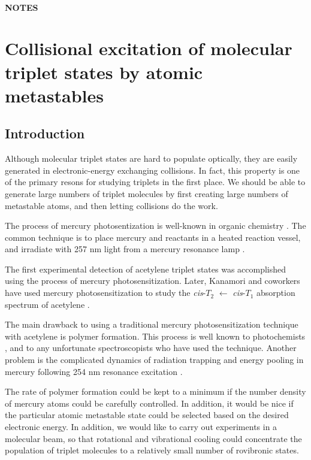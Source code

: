 \documentclass[12pt]{mitthesis}
\begin{document}
\tableofcontents
\clearpage

\subsubsection*{NOTES}
\clearpage

\chapter{Collisional excitation of molecular triplet states by atomic
  metastables}

\section{Introduction}


Although molecular triplet states are hard to populate optically, they
are easily generated in electronic-energy exchanging collisions.  In
fact, this property is one of the primary resons for studying triplets
in the first place.  We should be able to generate large numbers of
triplet molecules by first creating large numbers of metastable atoms,
and then letting collisions do the work.

The process of mercury photosentization is well-known in organic
chemistry \cite{brown89, brown88, crabtree92, cvetanovic64,
  phillips74, strausz70}.  The common technique is to place mercury
and reactants in a heated reaction vessel, and irradiate with 257 nm
light from a mercury resonance lamp \cite{brown87}.

The first experimental detection of acetylene triplet states was
accomplished using the process of mercury photosensitization.  Later,
Kanamori and coworkers have used mercury photosensitization to study
the \emph{cis}-$T_2$ $\leftarrow$ \emph{cis}-$T_1$ absorption spectrum
of acetylene \cite{kanamori07}.

The main drawback to using a traditional mercury photosensitization
technique with acetylene is polymer formation.  This process is well
known to photochemists \cite{shida58, leroy44}, and to any unfortunate
spectroscopists who have used the technique.  Another problem is the
complicated dynamics of radiation trapping and energy pooling in
mercury following 254 nm resonance excitation \cite{menningen00,
  herd05, majetich89, majetich91}.

The rate of polymer formation could be kept to a minimum if the number
density of mercury atoms could be carefully controlled.  In addition,
it would be nice if the particular atomic metastable state could be
selected based on the desired electronic energy.  In addition, we
would like to carry out experiments in a molecular beam, so that
rotational and vibrational cooling could concentrate the population of
triplet molecules to a relatively small number of rovibronic states.
\end{document}
